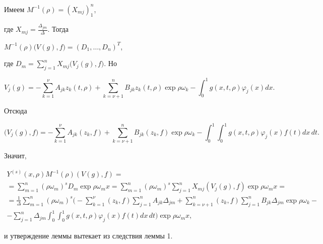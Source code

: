 \begin{pf}


Имеем $M^{-1}(\rho)=(X_{mj})_1^n$,


где $X_{mj}= \frac{\Delta_{jm}}{\Delta}$. Тогда


$M^{-1}(\rho)\big(V(g),f\big)=(D_1,\dotsc,D_n)^T$,


где $D_m=\sum\limits_{j=1}^nX_{mj}\big(V_j(g),f\big)$. Но


$$


V_j(g)=-\sum_{k=1}^\nu A_{jk}z_k(t,\rho)+\sum_{k=\nu+1}^n


B_{jk}z_k(t,\rho)\exp\rho\omega_k-\int_0^1


g(x,t,\rho)\varphi_j(x)dx.


$$


Отсюда


$$


\big(V_j(g),f\big)=-\sum\limits_{k=1}^\nu A_{jk}(z_k,f)+


\sum\limits_{k=\nu+1}^n B_{jk}(z_k,f)\exp\rho\omega_k-


\int_0^1\int_0^1g(x,t,\rho)


\varphi_j(x)f(t)dx\,dt.


$$


Значит,


\begin{multline*}


Y^{(s)}(x,\rho)M^{-1}(\rho)(V(g),f)= \\


%


=\sum\limits_{m=1}^n(\rho\omega_m)^sD_m\exp\rho\omega_mx=


\sum\limits_{m=1}^n(\rho\omega_m)^s\sum\limits_{j=1}^nX_{mj}


(V_j(g),f)\exp\rho\omega_mx= \\


%


= \frac 1{\Delta}\sum\limits_{m=1}^n(\rho\omega_m)^s\bigg(-\sum


\limits_{k=1}^{\nu}(z_k,f)\sum\limits_{j=1}^nA_{jk}\Delta_{jm}+


\sum\limits_{k=\nu+1}^n(z_k,f)\sum\limits_{j=1}^nB_{jk}\Delta_


{jm}\exp\rho\omega_k- \\


%


-\sum\limits_{j=1}^n\Delta_{jm}\int_0^1


\int_0^1g(x,t,\rho)\varphi_j(x)f(t)dx\,dt\bigg)


\exp\rho\omega_mx,


\end{multline*}


и утверждение леммы вытекает из следствия леммы 1.


\end{pf}






